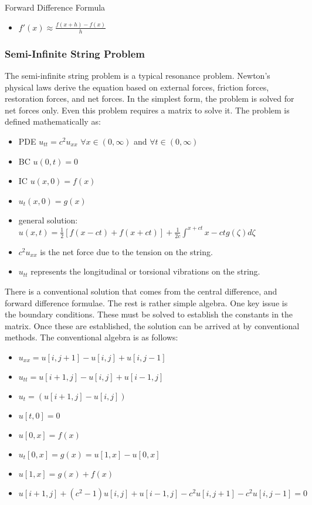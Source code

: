 \documentclass[11pt]{article}
\begin{document}
Forward Difference Formula
\begin{itemize}
\item $f'(x) \approx \frac{f(x+h) - f(x)}{h} $
\end{itemize}


\subsubsection {Semi-Infinite String Problem}
The semi-infinite string problem is a typical resonance problem.  Newton's physical laws derive the equation based on external forces, friction forces, restoration forces, and net forces.   In the simplest form, the problem is solved for net forces only.  Even this problem requires a matrix to solve it.  The problem is defined mathematically as:

\begin{itemize}
\item PDE $u_{tt} = c^2 u_{xx}$  $\forall x \in (0, \infty)$ and $\forall t \in (0,\infty)$ 
\item BC $u(0,t) = 0$
\item IC $u(x,0)= f(x)$
\item $u_t (x,0) = g(x)$
\item general solution: $ u(x,t) = \frac{1}{2} [ f(x-ct) + f(x+ct)] + \frac{1}{2c} \int ^{x+ct}{x-ct} g(\zeta) d\zeta$
\item $c^2 u_{xx} $ is the net force due to the tension on the string.
\item $u_{tt}$  represents the longitudinal or torsional vibrations on the string.
\end{itemize}

There is a conventional solution that comes from the central difference, and forward difference formulae.  The rest is rather simple algebra.  One key issue is the boundary conditions.  These must be solved to establish the constants in the matrix.  Once these are established, the solution can be arrived at by conventional methods.    The conventional algebra is as follows:

\begin{itemize}
\item $u_{xx} = u[i,j+1] - u[i,j] + u[i,j-1] $
\item $u_{tt} = u[i+1,j] - u[i,j] + u[i-1,j] $
\item $u_t = (u[i+1,j] - u[i,j]) $
\item $u[t,0] = 0 $
\item $u[0,x] = f(x) $
\item $u_t [0,x] = g(x) = u [1, x] - u[0,x] $
\item $u[1,x] = g(x) + f(x) $
\item $ u[i+1,j] + (c^2 - 1)u[i,j] + u[i-1,j] - c^2u[i,j+1]  - c^2 u[i,j-1] = 0 $
\end{itemize}
\end{document}
